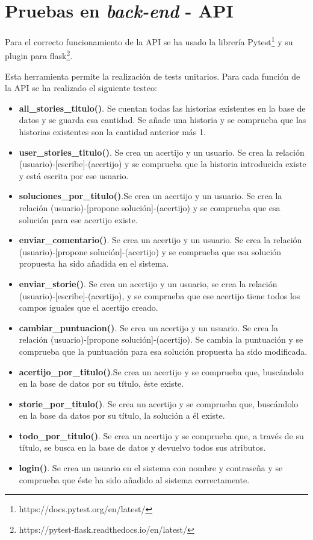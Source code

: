 \section{Pruebas en \textit{back-end} - API}

Para el correcto funcionamiento de la API se ha usado la librería Pytest\footnote{https://docs.pytest.org/en/latest/} y su plugin para flask\footnote{https://pytest-flask.readthedocs.io/en/latest/}.

Esta herramienta permite la realización de tests unitarios. Para cada función de la API se ha realizado el siguiente testeo:

\begin{itemize}
    \item \textbf{all\_stories\_titulo()}. Se cuentan todas las historias existentes en la base de datos y se guarda esa cantidad. Se añade una historia y se comprueba que las historias existentes son la cantidad anterior más 1.
     \item \textbf{user\_stories\_titulo()}. Se crea un acertijo y un usuario. Se crea la relación (usuario)-[escribe]-(acertijo) y se comprueba que la historia introducida existe y está escrita por ese usuario.
     \item \textbf{soluciones\_por\_titulo()}.Se crea un acertijo y un usuario. Se crea la relación (usuario)-[propone solución]-(acertijo) y se comprueba que esa solución para ese acertijo existe.
     \item \textbf{enviar\_comentario()}. Se crea un acertijo y un usuario. Se crea la relación (usuario)-[propone solución]-(acertijo) y se comprueba que esa solución propuesta ha sido añadida en el sistema.
     \item \textbf{enviar\_storie()}. Se crea un acertijo y un usuario, se crea la relación (usuario)-[escribe]-(acertijo), y se comprueba que ese acertijo tiene todos los campos iguales que el acertijo creado.
     \item \textbf{cambiar\_puntuacion()}. Se crea un acertijo y un usuario. Se crea la relación (usuario)-[propone solución]-(acertijo). Se cambia la puntuación y se comprueba que la puntuación para esa solución propuesta ha sido modificada.
     \item \textbf{acertijo\_por\_titulo()}.Se crea un acertijo y se comprueba que, buscándolo en la base de datos por su título, éste existe.
     \item \textbf{storie\_por\_titulo()}. Se crea un acertijo y se comprueba que, buscándolo en la base da datos por su título, la solución a él existe.
     \item \textbf{todo\_por\_titulo()}. Se crea un acertijo y se comprueba que, a través de su título, se busca en la base de datos y devuelvo todos sus atributos.
     \item \textbf{login()}. Se crea un usuario en el sistema con nombre y contraseña y se comprueba que éste ha sido añadido al sistema correctamente.
\end{itemize}

